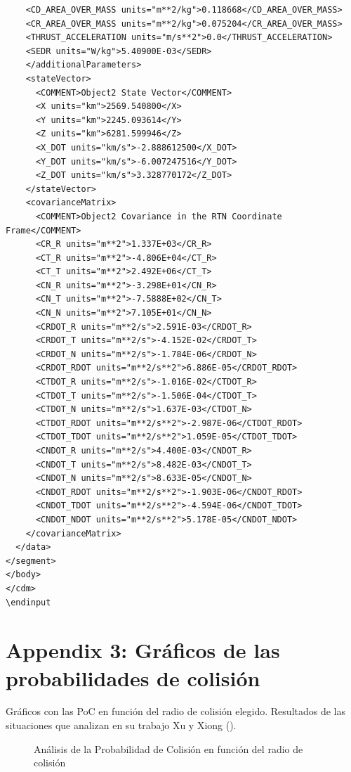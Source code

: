 \begin{lstlisting}
    <CD_AREA_OVER_MASS units="m**2/kg">0.118668</CD_AREA_OVER_MASS>
    <CR_AREA_OVER_MASS units="m**2/kg">0.075204</CR_AREA_OVER_MASS>
    <THRUST_ACCELERATION units="m/s**2">0.0</THRUST_ACCELERATION>
    <SEDR units="W/kg">5.40900E-03</SEDR>
    </additionalParameters>
    <stateVector>
      <COMMENT>Object2 State Vector</COMMENT>
      <X units="km">2569.540800</X>
      <Y units="km">2245.093614</Y>
      <Z units="km">6281.599946</Z>
      <X_DOT units="km/s">-2.888612500</X_DOT>
      <Y_DOT units="km/s">-6.007247516</Y_DOT>
      <Z_DOT units="km/s">3.328770172</Z_DOT>
    </stateVector>
    <covarianceMatrix>
      <COMMENT>Object2 Covariance in the RTN Coordinate Frame</COMMENT>
      <CR_R units="m**2">1.337E+03</CR_R>
      <CT_R units="m**2">-4.806E+04</CT_R>
      <CT_T units="m**2">2.492E+06</CT_T>
      <CN_R units="m**2">-3.298E+01</CN_R>
      <CN_T units="m**2">-7.5888E+02</CN_T>
      <CN_N units="m**2">7.105E+01</CN_N>
      <CRDOT_R units="m**2/s">2.591E-03</CRDOT_R>
      <CRDOT_T units="m**2/s">-4.152E-02</CRDOT_T>
      <CRDOT_N units="m**2/s">-1.784E-06</CRDOT_N>
      <CRDOT_RDOT units="m**2/s**2">6.886E-05</CRDOT_RDOT>
      <CTDOT_R units="m**2/s">-1.016E-02</CTDOT_R>
      <CTDOT_T units="m**2/s">-1.506E-04</CTDOT_T>
      <CTDOT_N units="m**2/s">1.637E-03</CTDOT_N>
      <CTDOT_RDOT units="m**2/s**2">-2.987E-06</CTDOT_RDOT>
      <CTDOT_TDOT units="m**2/s**2">1.059E-05</CTDOT_TDOT>
      <CNDOT_R units="m**2/s">4.400E-03</CNDOT_R>
      <CNDOT_T units="m**2/s">8.482E-03</CNDOT_T>
      <CNDOT_N units="m**2/s">8.633E-05</CNDOT_N>
      <CNDOT_RDOT units="m**2/s**2">-1.903E-06</CNDOT_RDOT>
      <CNDOT_TDOT units="m**2/s**2">-4.594E-06</CNDOT_TDOT>
      <CNDOT_NDOT units="m**2/s**2">5.178E-05</CNDOT_NDOT>
    </covarianceMatrix>
  </data>
</segment>
</body>
</cdm>
\endinput
\end{lstlisting}

\newpage
\section{Appendix 3: Gr\'aficos de las probabilidades de colisi\'on}
\label{App2}

Gr\'aficos con las PoC en funci\'on del radio de colisi\'on elegido. 
Resultados de las situaciones que analizan en su trabajo Xu y Xiong (\citep{xu2014method}).


\begin{figure}[!h]
  \centering
  \caption{An\'alisis de la Probabilidad de Colisi\'on en funci\'on del radio de colisi\'on}
  \label{fig:pocvsraEsc4}
\end{figure}


